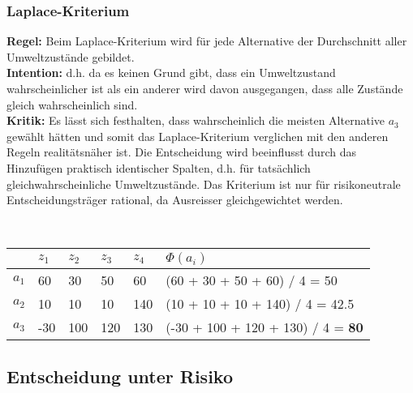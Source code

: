 \subsubsection{Laplace-Kriterium}
\textbf{Regel:} Beim Laplace-Kriterium wird für jede Alternative der Durchschnitt aller Umweltzustände gebildet. \\
\textbf{Intention:}  d.h. da es keinen Grund gibt, dass ein Umweltzustand wahrscheinlicher ist als ein anderer wird davon ausgegangen, dass alle Zustände gleich wahrscheinlich sind.\\
\textbf{Kritik:} Es lässt sich festhalten, dass wahrscheinlich die meisten Alternative $a_3$ gewählt hätten und somit das Laplace-Kriterium verglichen mit den anderen Regeln realitätsnäher ist. Die Entscheidung wird beeinflusst durch das Hinzufügen praktisch identischer Spalten, d.h. für tatsächlich gleichwahrscheinliche Umweltzustände. Das Kriterium ist nur für risikoneutrale Entscheidungsträger rational, da Ausreisser gleichgewichtet werden.
\begin{example} \\
	\begin{tabular}{|l|l|l|l|l|l|}
		\hline
		& $z_1$ & $z_2$ & $z_3$ & $z_4$ & $\Phi(a_i)$ \\ \hline
		$a_1$ & 60 & 30 & 50 & 60 & (60 + 30 + 50 + 60) / 4 = 50 \\ \hline
		$a_2$ & 10 & 10 & 10 & 140 & (10 + 10 + 10 + 140) / 4 = 42.5 \\ \hline
		$a_3$ & -30 & 100 & 120 & 130 & (-30 + 100 + 120 + 130) / 4 = \textbf{80} \\ \hline		
	\end{tabular}
\end{example}

\subsection{Entscheidung unter Risiko}
